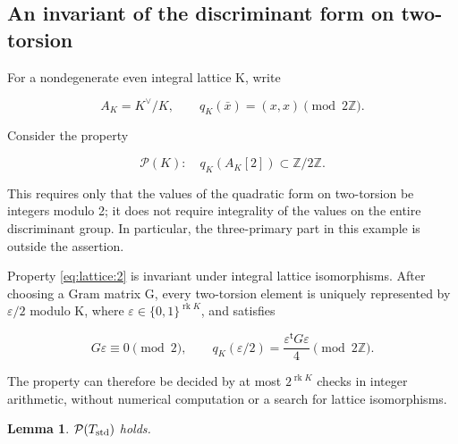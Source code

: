 \documentclass[11pt,a4paper,oneside]{article}
\theoremstyle{plain}
\newtheorem{lemma}[theorem]{Lemma}
\theoremstyle{definition}
\theoremstyle{remark}
\numberwithin{equation}{section}
\begin{document}
\subsection{An invariant of the discriminant form on two-torsion}\label{sec:lattice:2}

For a nondegenerate even integral lattice K, write

\begin{equation}
A_K=K^\vee/K,\qquad
 q_K(\bar x)=(x,x)\pmod{2\mathbb Z}.
\end{equation}

Consider the property

\begin{equation}
\mathcal P(K):\quad q_K(A_K[2])\subset\mathbb Z/2\mathbb Z.       \label{eq:lattice:2}
\end{equation}

This requires only that the values of the quadratic form on two-torsion be integers modulo 2; it does not require integrality of the values on the entire discriminant group. In particular, the three-primary part in this example is outside the assertion.

Property \eqref{eq:lattice:2} is invariant under integral lattice isomorphisms. After choosing a Gram matrix G, every two-torsion element is uniquely represented by \(\varepsilon/2\) modulo K, where \(\varepsilon\in\{0,1\}^{\operatorname{rk}K}\), and satisfies

\begin{equation}
G\varepsilon\equiv0\pmod2,\qquad
 q_K(\varepsilon/2)=\frac{\varepsilon^{\mathsf t}G\varepsilon}{4}
                      \pmod{2\mathbb Z}.                         \label{eq:lattice:3}
\end{equation}

The property can therefore be decided by at most \(2^{\operatorname{rk}K}\) checks in integer arithmetic, without numerical computation or a search for lattice isomorphisms.

\begin{lemma}

\(\mathcal P(T_{\rm std})\) holds.

\end{lemma}
\end{document}
